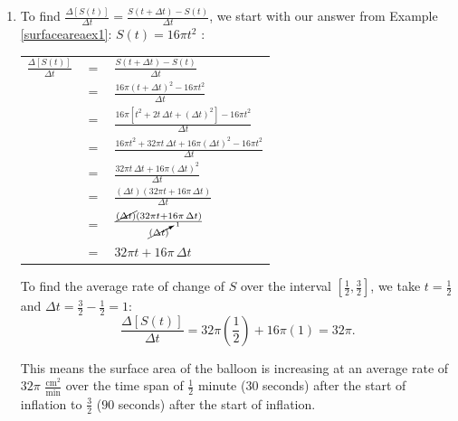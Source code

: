 \documentclass{ximera}
\begin{document}
\begin{example}
\begin{explanation}
\begin{enumerate}
The fact that the average rate of change here is constant shouldn't be too surprising.  Note $r(t) = 2t$ is a linear function with slope $2$.  Hence, `$2$' is the (constant) rate of change of $r$.\footnote{We could probably have lead with that and avoided some tedious computations \ldots}  This means that the radius of the balloon is increasing at a constant rate of $2$ $\frac{\text{cm}}{\text{min}}$.

\item  To find  $\frac{\Delta[S(t)]}{\Delta t} = \frac{S(t+ \Delta t) - S(t)}{\Delta t}$, we start with our answer from Example \ref{surfaceareaex1}:  $S(t) =  16 \pi t^{2}$ :

\begin{longtable}{rcl}

 $\frac{\Delta[S(t)]}{\Delta t}$ & $=$ &$\frac{S(t+ \Delta t) - S(t)}{\Delta t}$   \\
                         & $=$ & $\frac{16 \pi (t+ \Delta t)^2 - 16 \pi t^2}{\Delta t}$ \\
                         & $=$ & $\frac{16 \pi \left[ t^2 + 2 t \, \Delta t + (\Delta t)^2\right]  - 16 \pi t^2}{\Delta t}$ \\
                         & $=$ & $\frac{16 \pi t^2 + 32 \pi t \, \Delta t + 16 \pi (\Delta t)^2   - 16 \pi t^2}{\Delta t}$ \\
                         & $=$ & $\frac{32 \pi t \, \Delta t + 16 \pi (\Delta t)^2}{\Delta t}$ \\
                         & $=$ & $\frac{(\Delta t) (32 \pi t + 16 \pi \, \Delta t)}{\Delta t}$ \\
                         & $=$ & $\frac{\cancel{(\Delta t)} (32 \pi t + 16 \pi \, \Delta t)}{\cancelto{1}{(\Delta t)}}$ \\
                         & $=$ & $32 \pi t + 16 \pi \, \Delta t$  \\ \end{longtable}
                         
To find the average rate of change of $S$ over the interval $\left[\frac{1}{2}, \frac{3}{2}\right]$, we take $t = \frac{1}{2}$ and $\Delta t = \frac{3}{2} - \frac{1}{2} = 1$: \[\frac{\Delta[S(t)]}{\Delta t} = 32 \pi \left(\frac{1}{2}\right) + 16 \pi (1) = 32 \pi.\]

This means the surface area of the balloon  is increasing at an average rate of $32 \pi$ $\frac{\text{cm}^2}{\text{min}}$ over the time span of $\frac{1}{2}$ minute ($30$ seconds) after the start of inflation to $\frac{3}{2}$ ($90$ seconds) after the start of inflation.
               

\end{enumerate}
\end{explanation}
\end{example}
\end{document}
